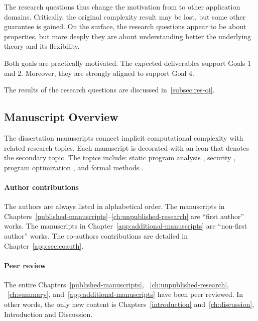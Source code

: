 The research questions thus change the motivation from 
to other application domains. Critically, the original complexity result may be
lost, but some other guarantee is gained. On the surface, the research questions
appear to be about properties, but more deeply they are about understanding
better the underlying theory and its flexibility.

Both goals are practically motivated. The expected deliverables support Goals
1 and 2. Moreover, they are strongly aligned to support Goal 4.

The results of the research questions are discussed in~\autoref{subsec:res-qi}.

\subsection{Manuscript Overview}
\label{ssec:manuscripts}

The dissertation manuscripts connect implicit computational complexity with
related research topics. Each manuscript is decorated with an icon that denotes
the secondary topic. The topics include: static program analysis \iconSPA,
security \iconSEC, program optimization \iconOPT, and formal methods \iconFM.


\paragraph*{Author contributions}
The authors are always listed in alphabetical order. The manuscripts in
Chapters~\autoref{published-manuscripts}--\autoref{ch:unpublished-research} are
\enquote{first author} works. The manuscripts in
Chapter~\autoref{app:additional-manuscripts} are \enquote{non-first author}
works. The co-authors contributions are detailed in
Chapter~\autoref{app:sec:coauth}.

\paragraph*{Peer review}
The entire Chapters~\autoref{published-manuscripts},
~\autoref{ch:unpublished-research}, ~\autoref{ch:summary},
and~\autoref{app:additional-manuscripts} have been peer reviewed. In other
words, the only new content is Chapters~\autoref{introduction}
and~\autoref{ch:discussion}, \ie Introduction and Discussion.

